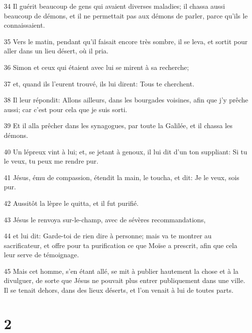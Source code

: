 \par 34 Il guérit beaucoup de gens qui avaient diverses maladies; il chassa aussi beaucoup de démons, et il ne permettait pas aux démons de parler, parce qu'ils le connaissaient.
\par 35 Vers le matin, pendant qu'il faisait encore très sombre, il se leva, et sortit pour aller dans un lieu désert, où il pria.
\par 36 Simon et ceux qui étaient avec lui se mirent à sa recherche;
\par 37 et, quand ils l'eurent trouvé, ils lui dirent: Tous te cherchent.
\par 38 Il leur répondit: Allons ailleurs, dans les bourgades voisines, afin que j'y prêche aussi; car c'est pour cela que je suis sorti.
\par 39 Et il alla prêcher dans les synagogues, par toute la Galilée, et il chassa les démons.
\par 40 Un lépreux vint à lui; et, se jetant à genoux, il lui dit d'un ton suppliant: Si tu le veux, tu peux me rendre pur.
\par 41 Jésus, ému de compassion, étendit la main, le toucha, et dit: Je le veux, sois pur.
\par 42 Aussitôt la lèpre le quitta, et il fut purifié.
\par 43 Jésus le renvoya sur-le-champ, avec de sévères recommandations,
\par 44 et lui dit: Garde-toi de rien dire à personne; mais va te montrer au sacrificateur, et offre pour ta purification ce que Moïse a prescrit, afin que cela leur serve de témoignage.
\par 45 Mais cet homme, s'en étant allé, se mit à publier hautement la chose et à la divulguer, de sorte que Jésus ne pouvait plus entrer publiquement dans une ville. Il se tenait dehors, dans des lieux déserts, et l'on venait à lui de toutes parts.

\chapter{2}

